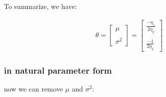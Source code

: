 \documentclass{article}
\begin{document}



To summarize, we have:

\begin{equation}\begin{split}
\theta = \begin{bmatrix} \mu \\ \; \\ \sigma^2   \end{bmatrix} 
= \begin{bmatrix}  \frac{ - \eta_1}{ 2 \eta_2} \\ \; \\ \frac{-1}{ 2 \eta_2}  \end{bmatrix}
\end{split}\end{equation}



\subsubsection{in natural parameter form}

now we can remove $\mu$ and $\sigma^2$:
\end{document}
